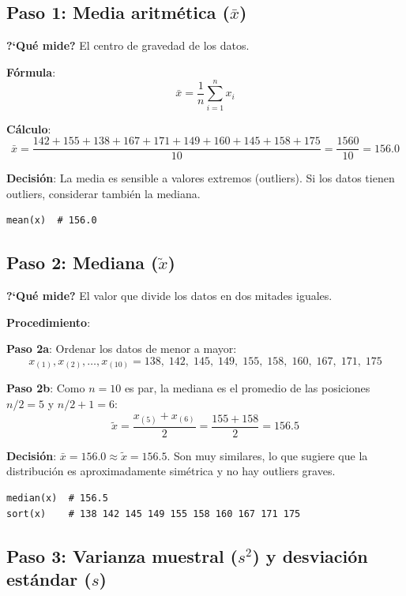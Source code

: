 \documentclass[11pt, a4paper]{article}
\begin{document}
\subsection{Paso 1: Media aritm\'etica ($\bar{x}$)}

\textbf{?`Qu\'e mide?} El centro de gravedad de los datos.

\textbf{F\'ormula}:
\[
\bar{x} = \frac{1}{n}\sum_{i=1}^{n} x_i
\]

\textbf{C\'alculo}:
\[
\bar{x} = \frac{142 + 155 + 138 + 167 + 171 + 149 + 160 + 145 + 158 + 175}{10}
= \frac{1560}{10} = \boxed{156.0}
\]

\textbf{Decisi\'on}: La media es sensible a valores extremos (outliers). Si los datos tienen
outliers, considerar tambi\'en la mediana.

\begin{lstlisting}
mean(x)  # 156.0
\end{lstlisting}

\subsection{Paso 2: Mediana ($\tilde{x}$)}

\textbf{?`Qu\'e mide?} El valor que divide los datos en dos mitades iguales.

\textbf{Procedimiento}:

\textbf{Paso 2a}: Ordenar los datos de menor a mayor:
\[
x_{(1)}, x_{(2)}, \ldots, x_{(10)} = 138,\; 142,\; 145,\; 149,\; 155,\; 158,\; 160,\; 167,\; 171,\; 175
\]

\textbf{Paso 2b}: Como $n = 10$ es par, la mediana es el promedio de las posiciones $n/2 = 5$ y $n/2 + 1 = 6$:
\[
\tilde{x} = \frac{x_{(5)} + x_{(6)}}{2} = \frac{155 + 158}{2} = \boxed{156.5}
\]

\textbf{Decisi\'on}: $\bar{x} = 156.0 \approx \tilde{x} = 156.5$. Son muy similares, lo que sugiere
que la distribuci\'on es aproximadamente sim\'etrica y no hay outliers graves.

\begin{lstlisting}
median(x)  # 156.5
sort(x)    # 138 142 145 149 155 158 160 167 171 175
\end{lstlisting}

\subsection{Paso 3: Varianza muestral ($s^2$) y desviaci\'on est\'andar ($s$)}
\end{document}
